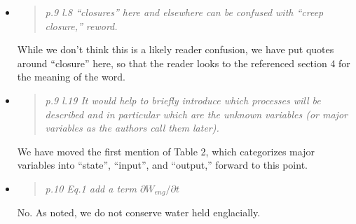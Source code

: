 \documentclass[11pt,reqno]{amsart}
\newcommand{\reply}[2]{
\medskip\medskip
\item  \begin{quote}
\emph{#1}
\end{quote}

\medskip
\noindent #2}
\begin{document}
\begin{itemize}
{\indent The evidence given is actually pretty good for this statement: The parameters in the model do not currently scale so as to generate a PDE limit. \\
\indent Thus we are in a bad situation, made worse in the same Appendix and by the reviewer.  The last sentence of the Appendix is a laughable claim of prospective performance without any basis: ``This variability should decrease further once real topography is used and is unlikely to be larger than the errors of field measurements.''\footnote{How are authors who look at real data supposed to publish if this kind of statement were to be believed in the idealized-geometry process-modeling literature before any real data?  The justification for publication of this kind of howler is that no one cares anyway?}  The reviewer's implication that what is missing from \cite{Werderetal2013} is merely a proof of convergence\footnote{``Whilst no mathematical proven of convergence \dots''} can only be deliberate indirection because we never came close to saying it was a lack of a ``proof'' of convergence that caused us to not implement conduits.  The claim by the reviewer of additional prospective ``automatic'' numerical performance\footnote{``Thus automatic grid-resolution determination should be possible.''} is shocking given the available evidence. \\
\indent Reviewers \# 1 and \# 3 want us to buy into this idea of using a 2D lattice model of conduits in a scalable ice sheet model, and the only evidence for this even being possible, much less the right modeling choice, is a manipulative sales job on top of evidence for the opposite view.  What are we supposed to be doing in reply to this?}

\reply{p.9 l.8 ``closures'' here and elsewhere can be confused with ``creep closure,'' reword.}
{While we don't think this is a likely reader confusion, we have put quotes around ``closure'' here, so that the reader looks to the referenced section 4 for the meaning of the word.}

\reply{p.9 l.19 It would help to briefly introduce which processes will be described and in
particular which are the unknown variables (or major variables as the authors call
them later).}
{We have moved the first mention of Table 2, which categorizes major variables into ``state'', ``input'', and ``output,'' forward to this point.}

\reply{p.10 Eq.1 add a term $\partial W_{eng}/\partial t$}
{No.  As noted, we do not conserve water held englacially.}


\end{itemize}
\end{document}
